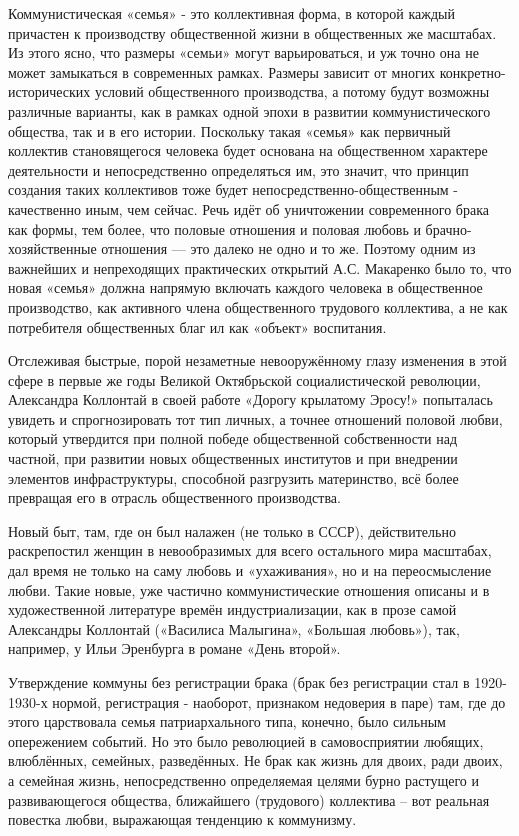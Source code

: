 \documentclass[12pt,a4paper,openany]{book}
\begin{document}
Коммунистическая «семья» - это коллективная форма, в которой каждый причастен к производству общественной жизни в общественных же масштабах. Из этого ясно, что размеры «семьи» могут варьироваться, и уж точно она не может замыкаться в современных рамках. Размеры зависит от многих конкретно-исторических условий общественного производства, а потому будут возможны различные варианты, как в рамках одной эпохи в развитии коммунистического общества, так и в его истории. Поскольку такая «семья» как первичный коллектив становящегося человека будет основана на общественном характере деятельности и непосредственно определяться им, это значит, что принцип создания таких коллективов тоже будет непосредственно-общественным - качественно иным, чем сейчас. Речь идёт об уничтожении современного брака как формы, тем более, что половые отношения и половая любовь и брачно-хозяйственные отношения — это далеко не одно и то же. Поэтому одним из важнейших и непреходящих практических открытий А.С. Макаренко было то, что новая «семья» должна напрямую включать каждого человека в общественное производство, как активного члена общественного трудового коллектива, а не как потребителя общественных благ ил как «объект» воспитания.

Отслеживая быстрые, порой незаметные невооружённому глазу изменения в этой сфере в первые же годы Великой Октябрьской социалистической революции, Александра Коллонтай в своей работе «Дорогу крылатому Эросу!» попыталась увидеть и спрогнозировать тот тип личных, а точнее отношений половой любви, который утвердится при полной победе общественной собственности над частной, при развитии новых общественных институтов и при внедрении элементов инфраструктуры, способной разгрузить материнство, всё более превращая его в отрасль общественного производства.

Новый быт, там, где он был налажен (не только в СССР), действительно раскрепостил женщин в невообразимых для всего остального мира масштабах, дал время не только на саму любовь и «ухаживания», но и на переосмысление любви. Такие новые, уже частично коммунистические отношения описаны и в художественной литературе времён индустриализации, как в прозе самой Александры Коллонтай («Василиса Малыгина», «Большая любовь»), так, например, у Ильи Эренбурга в романе «День второй».

Утверждение коммуны без регистрации брака (брак без регистрации стал в 1920-1930-х нормой, регистрация - наоборот, признаком недоверия в паре) там, где до этого царствовала семья патриархального типа, конечно, было сильным опережением событий. Но это было революцией в самовосприятии любящих, влюблённых, семейных, разведённых. Не брак как жизнь для двоих, ради двоих, а семейная жизнь, непосредственно определяемая целями бурно растущего и развивающегося общества, ближайшего (трудового) коллектива – вот реальная повестка любви, выражающая тенденцию к коммунизму.
\end{document}

